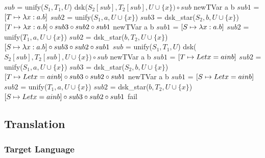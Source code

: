 \begin{algorithm}
\begin{multicols}{2}
\begin{algorithmic}[1]
        \State $sub$ = unify($S_1, T_1, U$)
        \State dsk($S_2[sub], T_2[sub], U \cup \{x\}) \circ sub $
        \State newTVar a b
        \State $sub1$ = $[T\mapsto\lambda x:a. b ]$
        \State $sub2$ = unify($S_1, a, U \cup \{x\}$)
        \State $sub3$ = dsk\_star($S_2, b, U \cup \{x\}$)
        \State \Return $ [T\mapsto\lambda x:a. b ] \circ sub3 \circ sub2 \circ sub1$
        \State newTVar a b
        \State $sub1$ = $[S\mapsto\lambda x:a. b ]$
        \State $sub2$ = unify($T_1, a, U \cup \{x\}$)
        \State $sub2$ = dsk\_star($b, T_2, U \cup \{x\}$)
        \State \Return $ [S\mapsto\lambda x:a. b ] \circ sub3 \circ sub2 \circ sub1$
        \State $sub$ = unify($S_1, T_1, U$)
        \State dsk($S_2[sub], T_2[sub], U \cup \{x\}) \circ sub $
        \State newTVar a b
        \State $sub1$ = $[T\mapsto Let x = a in b ]$
        \State $sub2$ = unify($S_1, a, U \cup \{x\}$)
        \State $sub3$ = dsk\_star($S_2, b, U \cup \{x\}$)
        \State \Return $ [T\mapsto Let x = a in b ] \circ sub3 \circ sub2 \circ sub1$
        \State newTVar a b
        \State $sub1$ = $[S\mapsto Let x = a in b ]$
        \State $sub2$ = unify($T_1, a, U \cup \{x\}$)
        \State $sub2$ = dsk\_star($b, T_2, U \cup \{x\}$)
        \State \Return $ [S\mapsto Let x = a in b ] \circ sub3 \circ sub2 \circ sub1$
    \Else
        \State fail
    \EndIf
\EndFunction
\end{algorithmic}
\end{multicols}
\end{algorithm}

\clearpage

\twocolumn
\subsection{Translation}

\newcommand{\transto}[1]{\hl{$\leadsto#1$}}
\newcommand{\translated}[1]{|#1|}
\newcommand{\cyancolorbox}[1]{\colorbox{cyan!30}{$#1$}}
\newcommand{\invariant}[2]{}

\subsubsection{Target Language}

